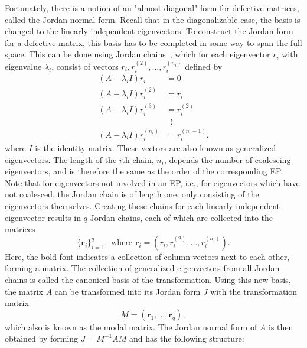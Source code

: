 \documentclass[../main.tex]{subfiles}
\begin{document}
Fortunately, there is a notion of an "almost diagonal" form for defective matrices, called the Jordan normal form. Recall that in the diagonalizable case, the basis is changed to the linearly independent eigenvectors. To construct the Jordan form for a defective matrix, this basis has to be completed in some way to span the full space. This can be done using Jordan chains~\cite{uffe}, which for each eigenvector $r_i$ with eigenvalue $\lambda_i$, consist of vectors $r_i, r_i^{(2)}, \dots,   r_i^{(n_i)}$ defined by
\begin{equation}\label{jordanchain}
\begin{aligned}
    (A-\lambda_iI)r_i &= 0 \\
    (A-\lambda_iI)r_i^{(2)} &= r_i \\
    (A-\lambda_iI)r_i^{(3)} &= r_i^{(2)} \\
    &\;\;\vdots \\
    (A-\lambda_iI)r_i^{(n_i)} &= r_i^{(n_i-1)}.
\end{aligned}
\end{equation}
where $I$ is the identity matrix. These vectors are also known as generalized eigenvectors. The length of the $i$th chain, $n_i$, depends the number of coalescing eigenvectors, and is therefore the same as the order of the corresponding EP. Note that for eigenvectors not involved in an EP, i.e., for eigenvectors which have not coalesced, the Jordan chain is of length one, only consisting of the eigenvectors themselves. Creating these chains for each linearly independent eigenvector results in $q$ Jordan chains, each of which are collected into the matrices
\begin{equation}
    \{\boldsymbol{r}_i\}_{i=1}^q, \text{ where }\boldsymbol{r}_i = (r_i, r_i^{(2)},\dots ,r_i^{(n_i)}).
\end{equation}
Here, the bold font indicates a collection of column vectors next to each other, forming a matrix. The collection of generalized eigenvectors from all Jordan chains is called the canonical basis of the transformation. Using this new basis, the matrix $A$ can be transformed into its Jordan form $J$ with the transformation matrix 
\begin{equation}\label{chofba}
    M = (\boldsymbol{r}_1, \dots, \boldsymbol{r}_q),
\end{equation}
which also is known as the modal matrix. The Jordan normal form of $A$ is then obtained by forming $J = M^{-1}AM$ and has the following structure: 
\end{document}

